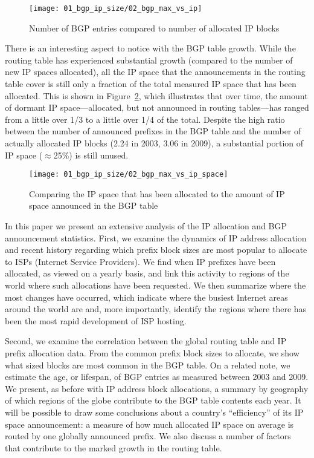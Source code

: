 \begin{figure}[htbp]
	\centering
		\texttt{[image: 01\_bgp\_ip\_size/02\_bgp\_max\_vs\_ip]}
	\caption{Number of BGP entries compared to number of allocated IP blocks}
	\label{fig:BGP vs RIR}
\end{figure}

There is an interesting aspect to notice with the BGP table growth. While the
routing table has experienced substantial growth (compared to the number of new
IP spaces allocated), all the IP space that the announcements in the routing
table cover is still only a fraction of the total measured IP space that has
been allocated. This is shown in Figure~\ref{fig:BGP vs RIR space}, which
illustrates that over time, the amount of dormant IP space---allocated, but not
announced in routing tables---has ranged from a little over 1/3 to a little
over 1/4 of the total. Despite the high ratio between the number of announced
prefixes in the BGP table and the number of actually allocated IP blocks (2.24
in 2003, 3.06 in 2009), a substantial portion of IP space ($\approx$25\%) is
still unused.

\begin{figure}[htbp]
	\centering
\texttt{[image: 01\_bgp\_ip\_size/02\_bgp\_max\_vs\_ip\_space]}
	\caption{Comparing the IP space that has been allocated to the amount of IP
			 space announced in the BGP table}
	\label{fig:BGP vs RIR space}
\end{figure}


%
%

In this paper we present an extensive analysis of the IP allocation and BGP
announcement statistics. First, we examine the dynamics of IP address
allocation and recent history regarding which prefix block sizes are most
popular to allocate to ISPs (Internet Service Providers). We find when IP
prefixes have been allocated, as viewed on a yearly basis, and link this
activity to regions of the world where such allocations have been requested. We
then summarize where the most changes have occurred, which indicate where the
busiest Internet areas around the world are and, more importantly, identify the
regions where there has been the most rapid development of ISP hosting.

Second, we examine the correlation between the global routing table and IP
prefix allocation data. From the common prefix block sizes to allocate, we show
what sized blocks are most common in the BGP table. On a related note, we
estimate the age, or lifespan, of BGP entries as measured between 2003 and
2009. We present, as before with IP address block allocations, a summary by
geography of which regions of the globe contribute to the BGP table contents
each year. It will be possible to draw some conclusions about a country's
``efficiency'' of its IP space announcement: a measure of how much allocated IP
space on average is routed by one globally announced prefix. We also discuss a
number of factors that contribute to the marked growth in the routing table.

